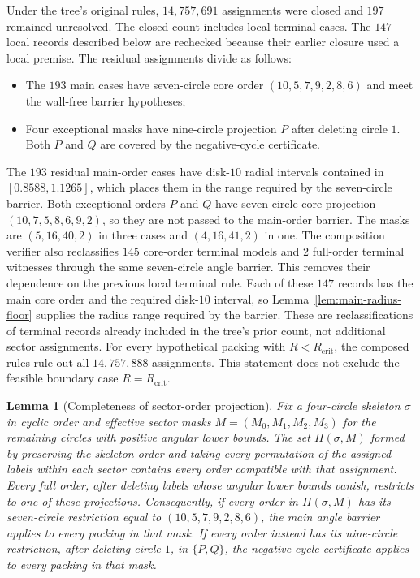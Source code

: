 \documentclass[11pt,a4paper]{article}
\newtheorem{lemma}[theorem]{Lemma}
\theoremstyle{remark}
\newcommand{\Rcrit}{R_{\mathrm{crit}}}
\begin{document}
Under the tree's original rules, $14{,}757{,}691$ assignments were closed
and $197$ remained unresolved.  The closed count includes local-terminal
cases.  The $147$ local records described below are rechecked because their
earlier closure used a local premise.  The residual assignments divide as
follows:
\begin{itemize}
  \item The $193$ main cases have seven-circle core order
        $(10,5,\allowbreak 7,9,\allowbreak 2,8,6)$ and meet the wall-free
        barrier hypotheses;
  \item Four exceptional masks have nine-circle projection $P$ after
        deleting circle $1$.  Both $P$ and $Q$ are covered by the
        negative-cycle certificate.
\end{itemize}
The $193$ residual main-order cases have disk-$10$ radial intervals
contained in $[0.8588,1.1265]$, which places them in the range required by
the seven-circle barrier.  Both exceptional orders $P$ and $Q$ have seven-circle core
projection $(10,7,5,8,6,9,2)$, so they are not passed to the main-order
barrier.
The masks are $(5,16,40,2)$ in three cases and $(4,16,41,2)$ in one.
The composition verifier also reclassifies $145$ core-order terminal models
and $2$ full-order terminal witnesses through the same seven-circle angle
barrier.  This removes their dependence on the previous local terminal rule.
Each of these $147$ records has the main core order and the required
disk-$10$ interval, so
Lemma~\ref{lem:main-radius-floor} supplies the radius range required by the
barrier.  These are reclassifications of terminal records already included
in the tree's prior count, not additional sector assignments.  For every
hypothetical packing with $R<\Rcrit$, the composed rules rule out all
$14{,}757{,}888$ assignments.  This statement does not exclude the feasible
boundary case $R=\Rcrit$.

\begin{lemma}[Completeness of sector-order projection]
\label{lem:sector-projection}
Fix a four-circle skeleton $\sigma$ in cyclic order and effective sector
masks $M=(M_0,M_1,M_2,M_3)$ for the remaining circles with positive angular
lower bounds.  The set $\Pi(\sigma,M)$ formed by preserving the skeleton
order and taking every permutation of the assigned labels within each sector
contains every order compatible with that assignment.  Every full order,
after deleting labels whose angular lower bounds vanish, restricts to one of
these projections.  Consequently, if every order in $\Pi(\sigma,M)$ has its
seven-circle restriction equal to
$(10,5,7,9,2,8,6)$, the main angle barrier applies to every packing in that
mask.  If every order instead has its nine-circle restriction, after
deleting circle $1$, in $\{P,Q\}$, the negative-cycle certificate applies
to every packing in that mask.
\end{lemma}
\end{document}
